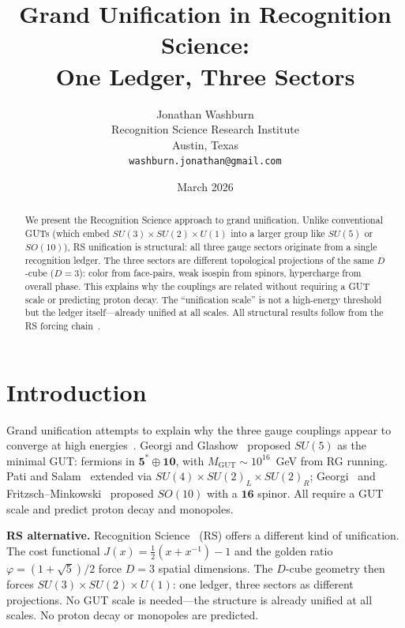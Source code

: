 \documentclass[12pt,a4paper]{article}
\title{Grand Unification in Recognition Science:\\
One Ledger, Three Sectors}
\author{Jonathan Washburn\\
Recognition Science Research Institute\\
Austin, Texas\\
\texttt{washburn.jonathan@gmail.com}}
\date{March 2026}
\theoremstyle{definition}
\theoremstyle{remark}
\begin{document}
\maketitle

\begin{abstract}
We present the Recognition Science approach to grand unification.
Unlike conventional GUTs (which embed
$SU(3) \times SU(2) \times U(1)$ into a larger group like $SU(5)$
or $SO(10)$), RS unification is structural: all three gauge sectors
originate from a single recognition ledger.  The three sectors are
different topological projections of the same $D$-cube ($D = 3$):
color from face-pairs, weak isospin from spinors, hypercharge from
overall phase.  This explains why the couplings are related without
requiring a GUT scale or predicting proton decay.  The ``unification
scale'' is not a high-energy threshold but the ledger itself---already
unified at all scales.  All structural results follow from the RS forcing chain~\cite{RS_Axioms}.
\end{abstract}

\section{Introduction}
\label{sec:intro}

Grand unification attempts to explain why the three gauge couplings
appear to converge at high energies~\cite{GeorgiGlashow1974}.
Georgi and Glashow~\cite{GeorgiGlashow1974} proposed $SU(5)$ as the
minimal GUT: fermions in $\mathbf{5}^* \oplus \mathbf{10}$, with
$M_{\mathrm{GUT}} \sim 10^{16}$~GeV from RG running.  Pati and
Salam~\cite{PatiSalam1974} extended via $SU(4) \times SU(2)_L \times
SU(2)_R$; Georgi~\cite{Georgi1975} and Fritzsch--Minkowski~\cite{FritzschMinkowski1975}
proposed $SO(10)$ with a $\mathbf{16}$ spinor.  All require a GUT
scale and predict proton decay and monopoles.

\textbf{RS alternative.}
Recognition Science~\cite{RS_Axioms} (RS) offers a different kind of unification.
The cost functional $J(x) = \tfrac{1}{2}(x + x^{-1}) - 1$ and the
golden ratio $\varphi = (1+\sqrt{5})/2$ force $D = 3$ spatial
dimensions.  The $D$-cube geometry then forces
$SU(3) \times SU(2) \times U(1)$: one ledger, three sectors as
different projections.  No GUT scale is needed---the structure is
already unified at all scales.  No proton decay or monopoles are
predicted.
\end{document}
